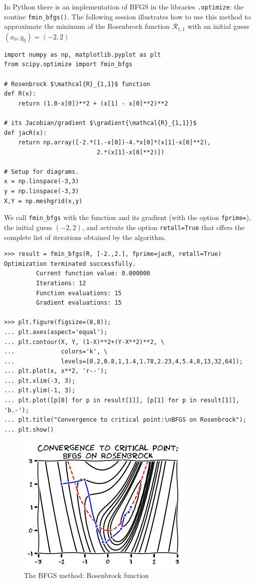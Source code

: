 \begin{example}
In Python there is an implementation of BFGS in the libraries \scipy\texttt{.optimize}: the routine \texttt{fmin\_bfgs()}.  The following session illustrates how to use this method to approximate the minimum of the Rosenbrock function $\mathcal{R}_{1,1}$  with an initial guess $(x_0, y_0)=(-2,2)$

\begin{verbatim}
import numpy as np, matplotlib.pyplot as plt 
from scipy.optimize import fmin_bfgs

# Rosenbrock $\mathcal{R}_{1,1}$ function
def R(x): 
	return (1.0-x[0])**2 + (x[1] - x[0]**2)**2

# its Jacobian/gradient $\gradient{\mathcal{R}_{1,1}}$
def jacR(x): 
	return np.array([-2.*(1.-x[0])-4.*x[0]*(x[1]-x[0]**2), 
                          2.*(x[1]-x[0]**2)])

# Setup for diagrams. 
x = np.linspace(-3,3)
y = np.linspace(-3,3)
X,Y = np.meshgrid(x,y)
\end{verbatim}

We call \texttt{fmin\_bfgs} with the function and its gradient (with the option \texttt{fprime=}), the initial guess $(-2,2)$, and activate the option \texttt{retall=True} that offers the complete list of iterations obtained by the algorithm.


\begin{verbatim}
>>> result = fmin_bfgs(R, [-2.,2.], fprime=jacR, retall=True)
Optimization terminated successfully.
         Current function value: 0.000000
         Iterations: 12
         Function evaluations: 15
         Gradient evaluations: 15

>>> plt.figure(figsize=(8,8));
... plt.axes(aspect='equal');
... plt.contour(X, Y, (1-X)**2+(Y-X**2)**2, \
...             colors='k', \
...             levels=[0.2,0.8,1,1.4,1.78,2.23,4,5.4,8,13,32,64]);
... plt.plot(x, x**2, 'r--');
... plt.xlim(-3, 3);
... plt.ylim(-1, 3);
... plt.plot([p[0] for p in result[1]], [p[1] for p in result[1]], 'b.-');
... plt.title("Convergence to critical point:\nBFGS on Rosenbrock");
... plt.show()
\end{verbatim}

\begin{figure}[ht!]
\includegraphics[width=0.65\linewidth]{images/bfgs.png}
\caption{The BFGS method: Rosenbrock function}
\label{figure:BFGS}
\end{figure}
\end{example}